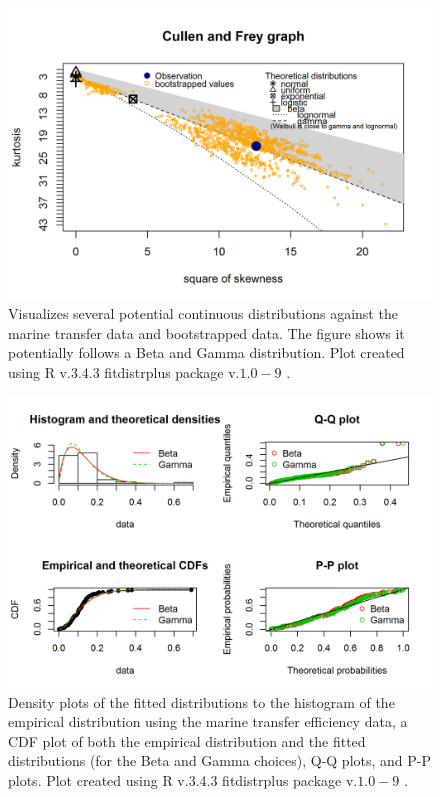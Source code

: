 \documentclass[oneside,12pt,final]{sty/ucthesis-CA2012}
\let\cite\citep                             %
\begin{document}
\begin{mainmatter}
\begin{figure}[H]
     \centering
       \includegraphics[width=.8\textwidth]{fig/cullen_frey_te}
    \caption{Visualizes several potential continuous distributions against the marine transfer data and bootstrapped data. The figure shows it potentially follows a Beta and Gamma distribution. Plot created using R v.3.4.3 \cite{Rcite} fitdistrplus package v.$1.0-9$ \cite{fitdistrplus}. }
    \label{cf_te_a1}
\end{figure}

\begin{figure}[H]
     \centering
       \includegraphics[width=.8\textwidth]{fig/gof_te}
    \caption{Density plots of the fitted distributions to the histogram of the empirical distribution using the marine transfer efficiency data, a CDF plot of both the empirical distribution and the fitted distributions (for the Beta and Gamma choices), Q-Q plots, and P-P plots. Plot created using R v.3.4.3 \cite{Rcite} fitdistrplus package v.$1.0-9$ \cite{fitdistrplus}. }
    \label{gof_te_a1}
\end{figure}


\end{mainmatter}
\end{document}
